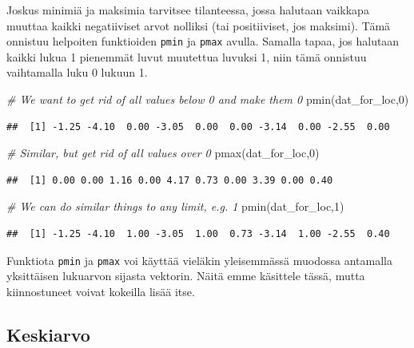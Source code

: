 \documentclass[
]{book}
\newenvironment{Shaded}{\begin{snugshade}}{\end{snugshade}}
\newcommand{\CommentTok}[1]{\textcolor[rgb]{0.56,0.35,0.01}{\textit{#1}}}
\newcommand{\DecValTok}[1]{\textcolor[rgb]{0.00,0.00,0.81}{#1}}
\newcommand{\FunctionTok}[1]{\textcolor[rgb]{0.00,0.00,0.00}{#1}}
\newcommand{\NormalTok}[1]{#1}
\begin{document}
Joskus minimiä ja maksimia tarvitsee tilanteessa, jossa halutaan vaikkapa muuttaa kaikki negatiiviset arvot nolliksi (tai positiiviset, jos maksimi). Tämä onnistuu helpoiten funktioiden \texttt{pmin} ja \texttt{pmax} avulla. Samalla tapaa, jos halutaan kaikki lukua 1 pienemmät luvut muutettua luvuksi 1, niin tämä onnistuu vaihtamalla luku 0 lukuun 1.

\begin{Shaded}
\begin{Highlighting}[]
\CommentTok{\# We want to get rid of all values below 0 and make them 0}
\FunctionTok{pmin}\NormalTok{(dat\_for\_loc,}\DecValTok{0}\NormalTok{)}
\end{Highlighting}
\end{Shaded}

\begin{verbatim}
##  [1] -1.25 -4.10  0.00 -3.05  0.00  0.00 -3.14  0.00 -2.55  0.00
\end{verbatim}

\begin{Shaded}
\begin{Highlighting}[]
\CommentTok{\# Similar, but get rid of all values over 0}
\FunctionTok{pmax}\NormalTok{(dat\_for\_loc,}\DecValTok{0}\NormalTok{)}
\end{Highlighting}
\end{Shaded}

\begin{verbatim}
##  [1] 0.00 0.00 1.16 0.00 4.17 0.73 0.00 3.39 0.00 0.40
\end{verbatim}

\begin{Shaded}
\begin{Highlighting}[]
\CommentTok{\# We can do similar things to any limit, e.g. 1}
\FunctionTok{pmin}\NormalTok{(dat\_for\_loc,}\DecValTok{1}\NormalTok{)}
\end{Highlighting}
\end{Shaded}

\begin{verbatim}
##  [1] -1.25 -4.10  1.00 -3.05  1.00  0.73 -3.14  1.00 -2.55  0.40
\end{verbatim}

Funktiota \texttt{pmin} ja \texttt{pmax} voi käyttää vieläkin yleisemmässä muodossa antamalla yksittäisen lukuarvon sijasta vektorin. Näitä emme käsittele tässä, mutta kiinnostuneet voivat kokeilla lisää itse.

\hypertarget{keskiarvo}{%
\subsection{Keskiarvo}\label{keskiarvo}}
\end{document}
